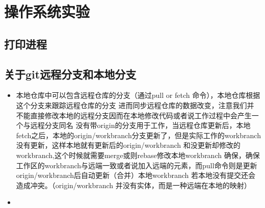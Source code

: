 \section{操作系统实验}
  \subsection{打印进程}
  \subsection{关于git远程分支和本地分支}
  \begin{itemize}
    \item 本地仓库中可以包含远程仓库的分支（通过pull or fetch 命令），本地仓库根据这个分支来跟踪远程仓库的分支
    进而同步远程仓库的数据改变，注意我们并不能直接修改本地的远程分支因而在本地修改代码或者说工作过程中会产生一个与远程分支同名
    没有带origin的分支用于工作，当远程仓库更新后，本地fetch之后，本地的origin/workbranch分支更新了，但是实际工作的workbranch
    没有更新，这样本地就有更新后的origin/workbranch 和没更新却修改的workbranch,这个时候就需要merge或则rebase修改本地workbranch
    确保，确保工作区的workbranch与远端一致或者说加入远端的元素，而pull命令则是更新origin/workbranch后自动更新（合并）本地workbranch
    若本地没有提交还会造成冲突。（origin/workbranch 并没有实体，而是一种远端在本地的映射）
    \item 
  \end{itemize}